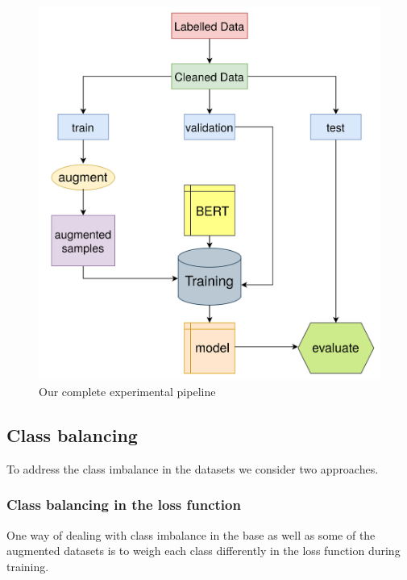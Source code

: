 \documentclass[11pt,a4paper]{article}
\begin{document}
\begin{figure}
    \centering
    \includegraphics[width=\columnwidth]{figs/pipeline.png}
    \caption{Our complete experimental pipeline}
    \label{fig:pipeline}
\end{figure}

\subsection{Class balancing}
To address the class imbalance in the datasets we consider two approaches.

\subsubsection{Class balancing in the loss function}
One way of dealing with class imbalance in the base as well as some of the augmented datasets is to weigh each class differently in the loss function during training.
\end{document}
